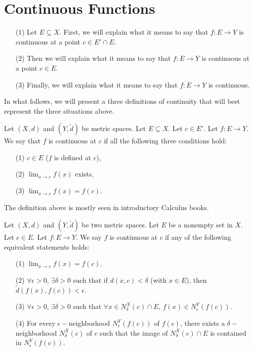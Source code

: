 \documentclass[a4paper]{article}
\begin{document}
\section{Continuous Functions}\label{Continuous Functions}

\begin{enumerate}
    \item[(1)] Let \( E \subseteq X  \). First, we will explain what it means to say that \( f: E \to Y \) is continuous at a point \( c \in E' \cap E  \).
    \item[(2)] Then we will explain what it means to say that \( f: E \to Y \) is continuous at a point \( c \in E  \). 
    \item[(3)] Finally, we will explain what it means to say that \( f: E \to Y \) is continuous.
\end{enumerate}

In what follows, we will present a three definitions of continuity that will best represent the three situations above.

\begin{definition}
    Let \( (X,d) \) and \( (Y,\tilde{d}) \) be metric spaces. Let \( E \subseteq X  \). Let \( c \in E' \). Let \( f: E \to Y \). We say that \( f  \) is continuous at \( c  \) if all the following three conditions hold:
    \begin{enumerate}
        \item[(1)] \( c \in E  \) (\( f \) is defined at \( c \)),
        \item[(2)] \( \lim_{ x \to c } f(x)  \) exists,
        \item[(3)] \( \lim_{ x \to c } f(x) = f(c) \).
    \end{enumerate}
\end{definition}

The definition above is mostly seen in introductory Calculus books. 

\begin{definition}
    Let \( (X,d) \) and \( (Y,\tilde{d}) \) be two metric spaces. Let \( E  \) be a nonempty set in \( X  \). Let \( c \in E  \). Let \( f: E \to Y \). We say \( f  \) is continuous at \( c  \) if any of the following equivalent statements holds:
\begin{enumerate}
    \item[(1)] \( \lim_{ x \to c } f(x) = f(c) \).
    \item[(2)] \( \forall \epsilon > 0 \), \( \exists \delta > 0 \) such that if \( d(x,c) < \delta \) (with \( x \in E  \)), then \( \tilde{d}(f(x), f(c)) < \epsilon \).
    \item[(3)] \( \forall \epsilon > 0 \), \( \exists \delta > 0  \) such that \( \forall x \in {N}_{\delta}^{X}(c) \cap E  \), \( f(x) \in {N}_{\epsilon}^{Y}(f(c)) \).
    \item[(4)] For every \( \epsilon- \)neighborhood \( {N}_{\epsilon}^{Y}(f(c))  \) of \( f(c) \), there exists a \( \delta- \)neighborhood \( {N}_{\delta}^{X}(c)  \) of \( c  \) such that the image of \( {N}_{\delta}^{X}(c) \cap E  \) is contained in \( {N}_{\epsilon}^{Y}(f(c)) \).
\end{enumerate}  
\end{definition}
 
\end{document}

